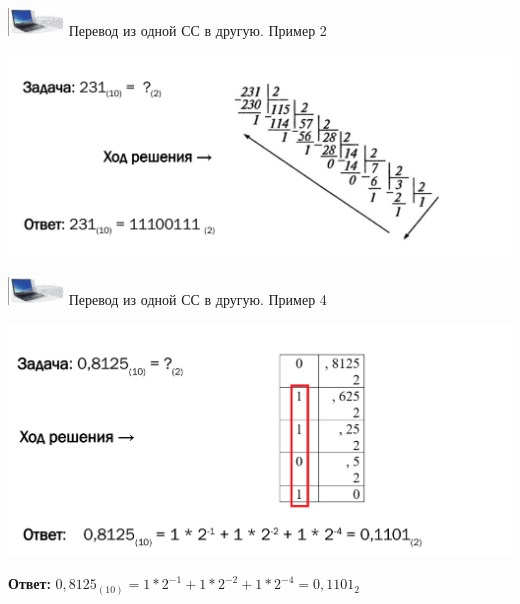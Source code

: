 \documentclass{beamer}
\begin{document}
\begin{frame}{\includegraphics[width=4em]{picture_logo.png} Перевод из одной СС в другую. Пример 2}
\begin{center}
    \includegraphics[width=\columnwidth]{26.png}
\end{center}
\end{frame}
\begin{frame}{\includegraphics[width=4em]{picture_logo.png} Перевод из одной СС в другую. Пример 4}

\begin{center}
    \includegraphics[width=\columnwidth]{28.png}
\end{center}
\textbf{Ответ:} $0,8125_{(10)} = 1 * 2^{-1} + 1 * 2^{-2} + 1 * 2^{-4} = 0,1101_2$
\end{frame}
\end{document}
